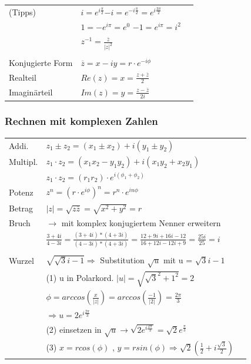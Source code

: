 \documentclass[6pt]{article}
\begin{document}
\begin{multicols*}{3}
\begin{tabular}{lll}
(Tipps) 					& $i = e^{i \frac{\pi}{2}} $\quad $-i = e^{-i \frac{\pi}{2}} = e^{i 									\frac{3\pi}{2}}$ \\
 									&  $1 = -e^{i \pi} = e^{0}$ \quad $-1 = e^{i \pi} = i^2$ \\
 									& $z^{-1} = \frac{\overline z}{|z|^2} $ \\
 									& \\
 Konjugierte Form & $\overline z = x -iy = r \cdot e^{-i \phi}$\\				
 Realteil 				& $Re(z) = x = \frac{z+\overline z}{2}$  \\
Imagin{\"a}rteil 	& $Im(z) = y = \frac{z-\overline z}{2i}$\\
 \end{tabular}

\subsubsection*{Rechnen mit komplexen Zahlen}
\begin{onehalfspace} 
\begin{tabular}{lll}
Addi.			&   $z_1 \pm z_2 = (x_1 \pm x_2) + i(y_1 \pm y_2)$\\
Multipl. 		&  $z_1 \cdot z_2 = (x_1x_2 - y_1y_2) + i(x_1y_2 + x_2y_1)$\\
					&  $z_1 \cdot z_2 = (r_1 r_2) \cdot e^{i(\phi_1 + \phi_2)}$ \\
Potenz 			& $z^n = (r \cdot e^{i \phi})^n = r^n \cdot e^{in \phi}$ \\
Betrag 			& $ |z| = \sqrt{z \overline{z}} = \sqrt{x^2+y^2} = r$\\
Bruch 			& $\rightarrow$ mit komplex konjugiertem Nenner erweitern	\\
					& $\frac{3+4i}{4-3i} = \frac{(3+4i)*(4+3i)}{(4-3i)*(4+3i)} = \frac{12+9i + 16i -12 }{16+12i - 12i +9} = \frac{25i}{25} = i $ \\
					& \\
Wurzel 			& $\sqrt{\sqrt{3}i-1} \Rightarrow $ Substitution $\sqrt{u}$ mit u = $					\sqrt{3}i-1$  \\
					& (1) u in Polarkord. $|u|=\sqrt{\sqrt{3}^2 + 1^2}=2$ \\
					& $\phi = arccos(\frac{x}{|z|}) = arccos(\frac{-1}{|2|}) = \frac{2\pi}{3}$ \\
					& $\Longrightarrow  u=2e^{i\frac{2\pi}{3}}$ \\ 
					& (2) einsetzen in $\sqrt{u} \rightarrow \sqrt{2e^{i\frac{2\pi}{3}}} = \sqrt{2}e^{\frac{\pi}{3}} $ \\
					& (3) $x=rcos(\phi)$ , $y=rsin(\phi) \Rightarrow \sqrt{2}(\frac{1}{2}+i\frac{\sqrt{3}}{2})$
\end{tabular}
\end{onehalfspace} 
\vspace{-3mm}


\end{multicols*}
\end{document}
